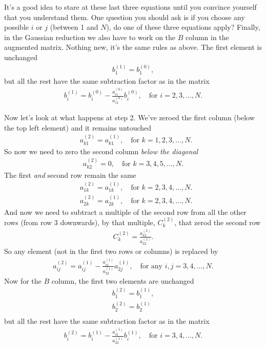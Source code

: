 It's a good idea to stare at these last three equations until you convince yourself that you understand them. One question you should ask is if you choose any possible $i$ or $j$ (between 1 and $N$), do one of these three equations apply? Finally, in the Gaussian reduction we also have to work on the $B$ column in the augmented matrix. Nothing new, it's the same rules as above. The first element is unchanged
\begin{align*}
b^{(1)}_1 = b^{(0)}_1,
\end{align*}
but all the rest have the same subtraction factor as in the matrix
\begin{align*}
b^{(1)}_{i} = b^{(0)}_{i} - \frac{a^{(0)}_{i1}}{a^{(0)}_{11}} b^{(0)}_i,  \quad \text{for } i=2,3,\dots,N.
\end{align*}

Now let's look at what happens at step 2. We've zeroed the first column (below the top left element) and it remains untouched
\begin{align*}
& a^{(2)}_{k1} = a^{(1)}_{k1},  \quad \text{for } k=1,2,3,\dots,N.
\end{align*}
So now we need to zero the second column \textit{below the diagonal}
\begin{align*}
a^{(2)}_{k2} = 0,  \quad \text{for } k=3,4,5,\dots,N.
\end{align*}
The first \textit{and} second row remain the same
\begin{align*}
& a^{(2)}_{1k} = a^{(1)}_{1k},  \quad \text{for } k=2,3,4,\dots,N. \\
& a^{(2)}_{2k} = a^{(1)}_{2k},  \quad \text{for } k=2,3,4,\dots,N.
\end{align*}
And now we need to subtract a multiple of the second row from all the other rows (from row 3 downwards), by that multiple, $C^{(2)}_k$, that zerod the second row
\begin{align*}
C^{(2)}_k = \frac{a^{(2)}_{k2}}{a^{(1)}_{22}}.
\end{align*}
So any element (not in the first two rows or columns) is replaced by
\begin{align*}
a^{(2)}_{ij} = a^{(1)}_{ij} - \frac{a^{(1)}_{i2}}{a^{(1)}_{22}} a^{(1)}_{2j},  \quad \text{for any } i,j=3,4,\dots,N.
\end{align*}
Now for the $B$ column, the first two elements are unchanged
\begin{align*}
b^{(2)}_1 = b^{(1)}_1, \\
b^{(2)}_2 = b^{(1)}_2 \\
\end{align*}
but all the rest have the same subtraction factor as in the matrix
\begin{align*}
b^{(2)}_{i} = b^{(1)}_{i} - \frac{a^{(1)}_{i2}}{a^{(1)}_{22}} b^{(1)}_i,  \quad \text{for } i=3,4,\dots,N.
\end{align*}

